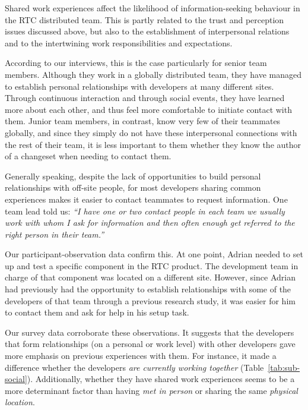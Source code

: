 \documentclass[12pt,oneside]{book}
\begin{document}
Shared work experiences affect the likelihood of information-seeking behaviour in the RTC distributed team. This is partly related to the trust and perception issues discussed above, but also to the establishment of interpersonal relations and to the intertwining work responsibilities and expectations.
\vspace{-2pt}

According to our interviews, this is the case particularly for senior team members. Although they work in a globally distributed team, they have managed to establish personal relationships with developers at many different sites. Through continuous interaction and through social events, they have learned more about each other, and thus feel more comfortable to initiate contact with them. Junior team members, in contrast, know very few of their teammates globally, and since they simply do not have these interpersonal connections with the rest of their team, it is less important to them whether they know the author of a changeset when needing to contact them.
\vspace{-2pt}

Generally speaking, despite the lack of opportunities to build personal relationships with off-site people, for most developers sharing common experiences makes it easier to contact teammates to request information. One team lead told us: \emph{``I have one or two contact people in each team we usually work with whom I ask for information and then often enough get referred to the right person in their team.''}
\vspace{-2pt}

Our participant-observation data confirm this. At one point, Adrian needed to set up and test a specific component in the RTC product. The development team in charge of that component was located on a different site. However, since Adrian had previously had the opportunity to establish relationships with some of the developers of that team through a previous research study, it was easier for him to contact them and ask for help in his setup task.
\vspace{-2pt}

Our survey data corroborate these observations. It suggests that the developers that form relationships (on a personal or work level) with other developers gave more emphasis on previous experiences with them. For instance, it made a difference whether the developers \emph{are currently working together} (Table~\ref{tab:sub-social}). Additionally, whether they have shared work experiences seems to be a more determinant factor than having \emph{met in person} or sharing the same \emph{physical location}.
\end{document}

